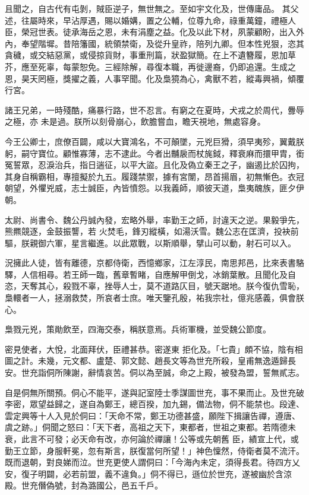 \begin{pinyinscope}
 且聞之，自古代有屯剝，賊臣逆子，無世無之。至如宇文化及，世傳庸品。
 其父述，往屬時來，早沾厚遇，賜以婚媾，置之公輔，位尊九命，祿重萬鐘，禮極人臣，榮冠世表。徒承海岳之恩，未有涓塵之益。化及以此下材，夙蒙顧盼，出入外內，奉望階墀。昔陪籓國，統領禁衛，及從升皇祚，陪列九卿。但本性兇狠，恣其貪穢，或交結惡黨，或侵掠貨財，事重刑篇，狀盈獄簡。在上不遺簪履，恩加草芥，應至死辜，每蒙恕免。三經除解，尋復本職，再徙邊裔，仍即追還。生成之恩，昊天罔極，獎擢之義，人事罕聞。化及梟獍為心，禽獸不若，縱毒興禍，傾覆行宮。



 諸王兄弟，一時殘酷，痛暴行路，世不忍言。有窮之在夏時，犬戎之於周代，釁辱之極，亦
 未是過。朕所以刻骨崩心，飲膽嘗血，瞻天視地，無處容身。



 今王公卿士，庶僚百闢，咸以大寶鴻名，不可顛墜，元兇巨猾，須早夷殄，翼戴朕躬，嗣守寶位。顧惟寡薄，志不逮此。今者出黼扆而杖旄鉞，釋衰麻而擐甲胄，銜冤誓眾，忍淚治兵，指日遄征，以平大盜。且化及偽立秦王之子，幽遏比於囚拘，其身自稱霸相，專擅擬於九五。履踐禁禦，據有宮闈，昂首揚眉，初無慚色。衣冠朝望，外懼兇威，志士誠臣，內皆憤怨。以我義師，順彼天道，梟夷醜族，匪夕伊朝。



 太尉、尚書令、魏公丹誠內發，宏略外舉，率勤王之師，討違天之逆。果毅爭先，熊羆競逐，金鼓振讋，若
 火焚毛，鋒刃縱橫，如湯沃雪。魏公志在匡濟，投袂前驅，朕親御六軍，星言繼進。以此眾戰，以斯順舉，擘山可以動，射石可以入。



 況擁此人徒，皆有離德，京都侍衛，西憶鄉家，江左淳民，南思邦邑，比來表書駱驛，人信相尋。若王師一臨，舊章暫睹，自應解甲倒戈，冰銷葉散。且聞化及自恣，天奪其心，殺戮不辜，挫辱人士，莫不道路仄目，號天踞地。朕今復仇雪恥，梟轘者一人，拯溺救焚，所哀者士庶。唯天鑒孔殷，祐我宗社，億兆感義，俱會朕心。



 梟戮元兇，策勛飲至，四海交泰，稱朕意焉。兵術軍機，並受魏公節度。



 密見使者，大悅，北面拜伏，臣禮甚恭。密遂東
 拒化及。「七貴」頗不協，陰有相圖之計。未幾，元文都、盧楚、郭文懿、趙長文等為世充所殺，皇甫無逸遁歸長安。世充詣侗所陳謝，辭情哀苦。侗以為至誠，命之上殿，被發為盟，誓無貳志。



 自是侗無所關預。侗心不能平，遂與記室陸士季謀圖世充，事不果而止。及世充破李密，眾望益歸之，遂自為鄭王，總百揆，加九錫，備法物，侗不能禁也。段達、雲定興等十人入見於侗曰：「天命不常，鄭王功德甚盛，願陛下揖讓告禪，遵唐、虞之跡。」侗聞之怒曰：「天下者，高祖之天下，東都者，世祖之東都。若隋德未衰，此言不可發；必天命有改，亦何論於禪讓！公等或先朝舊
 臣，績宣上代，或勤王立節，身服軒冕，忽有斯言，朕復當何所望！」神色懍然，侍衛者莫不流汗。既而退朝，對良娣而泣。世充更使人謂侗曰：「今海內未定，須得長君。待四方乂安，復子明闢，必若前盟，義不違負。」侗不得已，遜位於世充，遂被幽於含涼殿。世充僭偽號，封為潞國公，邑五千戶。




\end{pinyinscope}

